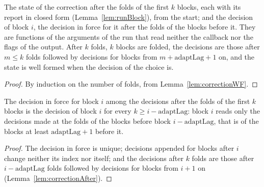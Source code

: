 \begin{lemma}\label{lem:correctionAfter}
  \leanok
  The state of the correction after the folds of the first $k$ blocks, each with its report in
  closed form (Lemma~\ref{lem:runBlock}), from the start; and the decision of block $i$, the
  decision in force for it after the folds of the blocks before it. They are functions of the
  arguments of the run that read neither the callback nor the flags of the output. After $k$ folds,
  $k$ blocks are folded, the decisions are those after $m \le k$ folds followed by decisions for
  blocks from $m + \mathrm{adaptLag} + 1$ on, and the state is well formed when the decision of the
  choice is.
\end{lemma}

\begin{proof}
  \leanok
  By induction on the number of folds, from Lemma~\ref{lem:correctionWF}.
\end{proof}

\begin{theorem}\label{thm:lag}
  \leanok
  The decision in force for block $i$ among the decisions after the folds of the first $k$ blocks is
  the decision of block $i$ for every $k \ge i - \mathrm{adaptLag}$: block $i$ reads only the
  decisions made at the folds of the blocks before block $i - \mathrm{adaptLag}$, that is of the
  blocks at least $\mathrm{adaptLag} + 1$ before it.
\end{theorem}

\begin{proof}
  \leanok
  The decision in force is unique; decisions appended for blocks after $i$ change neither its index
  nor itself; and the decisions after $k$ folds are those after $i - \mathrm{adaptLag}$ folds
  followed by decisions for blocks from $i + 1$ on (Lemma~\ref{lem:correctionAfter}).
\end{proof}

